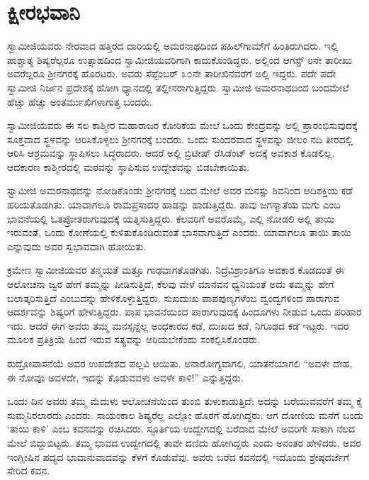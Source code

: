 
\chapter{ಕ್ಷೀರಭವಾನಿ}

 ಸ್ವಾಮೀಜಿಯವರು ನೇರವಾದ ಹತ್ತಿರದ ದಾರಿಯಲ್ಲಿ ಅಮರನಾಥದಿಂದ ಪಹಿಲ್‍ಗಾಮ್‍ಗೆ ಹಿಂತಿರುಗಿದರು. ಇಲ್ಲಿ ಪಾಶ್ಚಾತ್ಯ ಶಿಷ್ಯರೆಲ್ಲರೂ ಉತ್ಸಾಹದಿಂದ ಸ್ವಾಮೀಜಿಯವರಿಗಾಗಿ ಕಾದುಕೊಂಡಿದ್ದರು. ಅಲ್ಲಿಂದ ಆಗಸ್ಟ್ ೮ನೇ ತಾರೀಖು ಅವರೆಲ್ಲರೂ ಶ‍್ರೀನಗರಕ್ಕೆ ಹೊರಟರು. ಅವರು ಸೆಪ್ಟೆಂಬರ್ ೩೦ನೇ ತಾರೀಖಿನವರೆಗೆ ಅಲ್ಲಿ ಇದ್ದರು. ಪದೇ ಪದೇ ಸ್ವಾಮೀಜಿ ನಿರ್ಜನ ಪ್ರದೇಶಕ್ಕೆ ಹೋಗಿ ಧ್ಯಾನದಲ್ಲಿ ತಲ್ಲೀನರಾಗುತ್ತಿದ್ದರು. ಸ್ವಾಮೀಜಿ ಅಮರನಾಥದಿಂದ ಬಂದಮೇಲೆ ಹೆಚ್ಚು ಹೆಚ್ಚು ಅಂತರ್ಮುಖಿಗಳಾಗುತ್ತ ಬಂದರು. 

 ಸ್ವಾಮೀಜಿಯವರು ಈ ಸಲ ಕಾಶ್ಮೀರ ಮಹಾರಾಜರ ಕೋರಿಕೆಯ ಮೇಲೆ ಒಂದು ಕೇಂದ್ರವನ್ನು ಅಲ್ಲಿ ಪ್ರಾರಂಭಿಸುವುದಕ್ಕೆ ಸೂಕ್ತವಾದ ಸ್ಥಳವನ್ನು ಆರಿಸಿಕೊಳ್ಳಲು ಶ‍್ರೀನಗರಕ್ಕೆ ಬಂದರು. ಒಂದು ಸುಂದರವಾದ ಸ್ಥಳವನ್ನು ಜೀಲಂ ನದಿ ತೀರದಲ್ಲಿ ಆರಿಸಿ ಆಶ್ರಮವನ್ನು ಸ್ಥಾಪಿಸಲು ಸಿದ್ಧರಾದರು. ಆದರೆ ಅಲ್ಲಿ ಬ್ರಿಟೀಷ್ ರೆಸಿಡೆಂಟ್ ಅದಕ್ಕೆ ಅವಕಾಶ ಕೊಡಲಿಲ್ಲ. ಆದಕಾರಣ ಕಾಶ್ಮೀರದಲ್ಲಿ ಮಠವನ್ನು ಸ್ಥಾಪಿಸುವ ಉದ್ದೇಶವನ್ನು ಬಿಡಬೇಕಾಯಿತು. 

\vskip 2pt

 ಸ್ವಾಮೀಜಿ ಅಮರನಾಥವನ್ನು ನೋಡಿಕೊಂಡು ಶ‍್ರೀನಗರಕ್ಕೆ ಬಂದ ಮೇಲೆ ಅವರ ಮನಸ್ಸು ಶಿವನಿಂದ ಆದಿಶಕ್ತಿಯ ಕಡೆ ಹರಿಯತೊಡಗಿತು. ಯಾವಾಗಲೂ ರಾಮಪ್ರಸಾದರ ಹಾಡನ್ನು ಹಾಡುತ್ತಿದ್ದರು. ತಾವು ಜಗನ್ಮಾತೆಯ ಮಗು ಎಂಬ ಭಾವನೆಯಲ್ಲಿ ಓತಪ್ರೋತರಾಗುವುದಕ್ಕೆ ಯತ್ನಿಸುತ್ತಿದ್ದರು. ಕೆಲವರಿಗೆ ಅವರೊಮ್ಮೆ, ಎಲ್ಲಿ ನೋಡಲಿ ಅಲ್ಲಿ ತಾಯಿ ಇರುವಂತೆ, ಒಂದು ಕೋಣೆಯಲ್ಲಿ ಕುಳಿತುಕೊಂಡಿರುವಂತೆ ಭಾಸವಾಗುತ್ತಿದೆ ಎಂದರು. ಯಾವಾಗಲೂ ತಾಯಿ ತಾಯಿ ಎನ್ನುವುದು ಅವರ ಸ್ವಭಾವವಾಗಿ ಹೋಯಿತು. 

\vskip 2pt

 ಕ್ರಮೇಣ ಸ್ವಾಮೀಜಿಯವರ ತನ್ಮಯತೆ ಮತ್ತೂ ಗಾಢವಾಗತೊಡಗಿತು. ನಿದ್ರೆ\break ವಿಶ್ರಾಂತಿಗೂ ಅವಕಾಶ ಕೊಡದಂತೆ ಈ ಆಲೋಚನಾ ಜ್ವರ ಹೇಗೆ ತಮ್ಮನ್ನು ಪೀಡಿಸುತ್ತಿದೆ, ಕೆಲವು ವೇಳೆ ಮಾನವನ ಧ್ವನಿಯಂತೆ ಅದು ತಮ್ಮನ್ನು ಹೇಗೆ ಬಲಾತ್ಕರಿಸುತ್ತಿದೆ ಎಂಬುದನ್ನು ಹೇಳಿಕೊಳ್ಳುತ್ತಿದ್ದರು. ಸುಖದುಃಖ ಪಾಪಪುಣ್ಯಗಳೆಂಬ ದ್ವಂದ್ವಗಳಿಂದ ಪಾರಾಗುವ ಆದರ್ಶವನ್ನು ಶಿಷ್ಯರಿಗೆ ಹೇಳುತ್ತಿದ್ದರು. ಪಾಪ ಭಾವನೆಯಿಂದ ಪಾರಾಗುವುದಕ್ಕೆ ಹಿಂದೂಗಳು ನೀಡುವ ಒಂದು ಪರಿಹಾರ ಇದು. ಆದರೆ ಈಗ ಅವರು ತಮ್ಮ ಮನಸ್ಸನ್ನೆಲ್ಲ ಅಂಧಕಾರದ ಕಡೆ, ದುಃಖದ ಕಡೆ, ನಿಗೂಢದ ಕಡೆ ಇಟ್ಟರು. ಇದರ ಮೂಲಕ ಪ್ರತಿಕ್ರಿಯೆ ಹಿಂದೆ ಇರುವ ಸತ್ಯವನ್ನು ಅರಿಯಬೇಕೆಂದು ಸಂಕಲ್ಪಿಸಿಕೊಂಡರು. 

\vskip 2pt

 ರುದ್ರೋಪಾಸನೆಯೆ ಅವರ ಉಪದೇಶದ ಪಲ್ಲವಿ ಆಯಿತು. ಅನಾರೋಗ್ಯವಾಗಲಿ, ಯಾತನೆಯಾಗಲಿ “ಅವಳೇ ದೇಹ, ಈ ನೋವೂ ಅವಳದೇ, ಇದನ್ನು ಕೊಡುವವಳು ಅವಳೇ ಕಾಳಿ!” ಎನ್ನುತ್ತಿದ್ದರು. 

\vskip 2pt

 ಒಂದು ದಿನ ಅವರು ತಮ್ಮ ಮೆದುಳು ಆಲೋಚನೆಯಿಂದ ತುಂಬಿ ತುಳುಕಾಡುತ್ತಿದೆ; ಅದನ್ನು ಬರೆಯುವವರೆಗೆ ತಮ್ಮ ಕೈ ಸುಮ್ಮನಿರಲಾರದು ಎಂದರು. ಸಾಯಂಕಾಲ ಶಿಷ್ಯರೆಲ್ಲ ಎಲ್ಲೋ ಹೊರಗೆ ಹೋಗಿದ್ದರು. ಆಗ ದೋಣಿಯ ಮನೆಗೆ ಬಂದು ‘ತಾಯಿ ಕಾಳಿ’ ಎಂಬ ಕವನವನ್ನು ರಚಿಸಿದರು. ಸ್ಫೂರ್ತಿಯ ಉದ್ವೇಗದಲ್ಲಿ ಬರೆದಾದ ಮೇಲೆ ಅವರಿಗೇ ಸಾಕಾಗಿ ನೆಲದ ಮೇಲೆ ಬಿದ್ದುಬಿಟ್ಟರು. ತಮ್ಮ ಭಾವದ ಉದ್ವೇಗದಲ್ಲಿ ತಾವೇ ದಣಿದು ಹೋಗಿದ್ದರು ಎಂದು ಅನಂತರ ಹೇಳಿದರು. ಅವರ ಇಂಗ್ಲೀಷಿನ ಪದ್ಯದ ಭಾವಾನುವಾದವನ್ನು ಕೆಳಗೆ ಕೊಡುವೆವು. ಅವರು ಬರೆದ ಕವನದಲ್ಲಿ ಇದೊಂದು ಶ್ರೇಷ್ಠದರ್ಜೆಗೆ ಸೇರಿದ ಕವನ.

